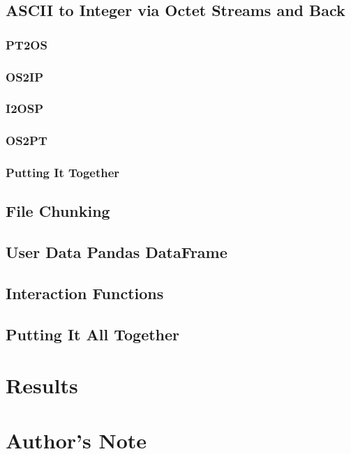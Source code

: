 \documentclass{article}
\begin{document}
\subsection{ASCII to Integer via Octet Streams and Back}
\subsubsection{PT2OS}
\subsubsection{OS2IP}
\subsubsection{I2OSP}
\subsubsection{OS2PT}
\subsubsection{Putting It Together}

\subsection{File Chunking}

\subsection{User Data Pandas DataFrame}

\subsection{Interaction Functions}

\subsection{Putting It All Together}

\newpage

\section{Results}

\newpage

\section{Author's Note}
\end{document}
